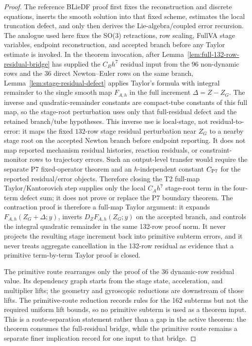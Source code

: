 \documentclass[preprint,12pt]{elsarticle}
\begin{document}
\begin{proof}
The reference BLieDF proof first fixes the reconstruction and discrete
equations, inserts the smooth solution into that fixed scheme, estimates the
local truncation defect, and only then derives the Lie-algebra/coupled error
recursion.  The analogue used here fixes the SO(3) retractions, row scaling,
FullVA stage variables, endpoint reconstruction, and accepted branch before
any Taylor estimate is invoked.  In the theorem invocation, after
Lemma~\ref{lem:full-132-row-residual-bridge} has supplied the \(C_Rh^7\)
residual input from the 96 non-dynamic rows and the 36 direct Newton--Euler
rows on the same branch, Lemma~\ref{lem:stage-residual-defect} applies
Taylor's formula with integral remainder to the single smooth map
\(F_{A,h}\) in the full increment \(\Delta=Z-Z_G\).
The inverse and quadratic-remainder constants are compact-tube constants of
this full map, so the stage-root perturbation uses only that full-residual
defect and the retained branch/tube hypotheses.
This inverse use is local-stage, not residual-to-error: it maps the
fixed \(132\)-row stage residual perturbation near \(Z_G\) to a nearby
stage root on the accepted Newton branch before endpoint reporting.  It does
not map reported mechanism residual histories, reaction residuals, or
constraint-monitor rows to trajectory errors.  Such an output-level transfer
would require the separate P7 fixed-operator theorem and an
\(h\)-independent constant \(C_{\rm P7}\) for the reported residual/error
objects.  Therefore closing the T2 full-map Taylor/Kantorovich step supplies
only the local \(C_Ah^7\) stage-root term in the four-term defect sum; it
does not prove or replace the P7 boundary theorem.
The contraction proof is therefore a full-map Taylor argument: it expands
\(F_{A,h}(Z_G+\Delta;y)\), inverts \(D_ZF_{A,h}(Z_G;y)\) on the accepted
branch, and controls the integral quadratic remainder in the same 132-row
proof norm.  It never projects the resulting stage increment back into
primitive subterm errors, and it never treats aggregate cancellation in the
132-row residual as evidence that a primitive term-by-term Taylor proof
is closed.

The primitive route rearranges only the proof of the 36 dynamic-row residual
value.  Its dependency graph starts from the stage state, acceleration, and
multiplier lifts; the geometry and gyroscopic reductions are downstream of
those lifts.  The primitive-route reduction records rules for the
162 subterms but not the required uniform lift bounds, so no primitive subterm
is used as a theorem input.  This is a route-separation statement rather than
a gap in the active theorem: the theorem consumes the full-residual bridge,
while the primitive route remains a separate finer implication record for one
input to that bridge.
\end{proof}
\end{document}
